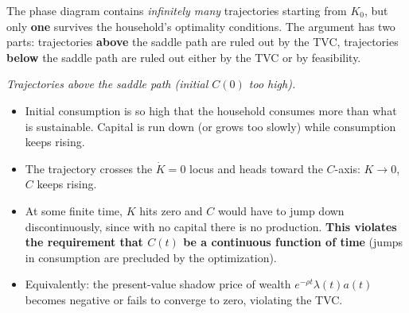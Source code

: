 \begin{tcolorbox}[
    colback=blue!1!white,
    colframe=blue!40!white,
    title=Why Exactly One Trajectory? Ruling Out All Others,
    fonttitle=\bfseries
    ]
The phase diagram contains \textit{infinitely many} trajectories starting from $K_0$, but only \textbf{one} survives the household's optimality conditions. The argument has two parts: trajectories \textbf{above} the saddle path are ruled out by the TVC, trajectories \textbf{below} the saddle path are ruled out either by the TVC or by feasibility.

\textit{Trajectories above the saddle path (initial $C(0)$ too high).}
\begin{itemize}
    \item Initial consumption is so high that the household consumes more than what is sustainable. Capital is run down (or grows too slowly) while consumption keeps rising.
    \item The trajectory crosses the $\dot K = 0$ locus and heads toward the $C$-axis: $K \to 0$, $C$ keeps rising.
    \item At some finite time, $K$ hits zero and $C$ would have to jump down discontinuously, since with no capital there is no production. \textbf{This violates the requirement that $C(t)$ be a continuous function of time} (jumps in consumption are precluded by the optimization).
    \item Equivalently: the present-value shadow price of wealth $e^{-\rho t}\lambda(t) a(t)$ becomes negative or fails to converge to zero, violating the TVC.
\end{itemize}


\end{tcolorbox}
